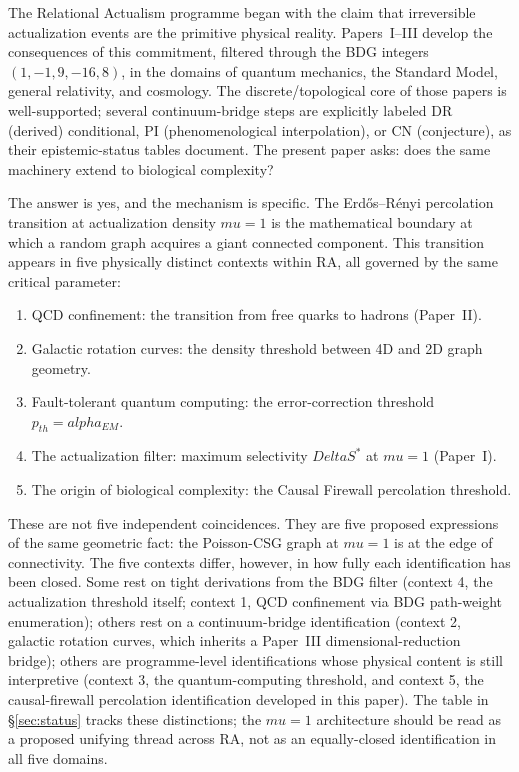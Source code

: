 \documentclass[11pt]{article}
\def\Delta{Delta}%
\def\mu{mu}%
\def\alpha{alpha}%
\def\mathrm#1{#1}%
\begin{document}
The Relational Actualism programme began with the claim that irreversible actualization events are the primitive physical reality. Papers~I--III develop the consequences of this commitment, filtered through the BDG integers $(1,-1,9,-16,8)$, in the domains of quantum mechanics, the Standard Model, general relativity, and cosmology. The discrete/topological core of those papers is well-supported; several continuum-bridge steps are explicitly labeled DR (derived) conditional, PI (phenomenological interpolation), or CN (conjecture), as their epistemic-status tables document. The present paper asks: does the same machinery extend to biological complexity?

The answer is yes, and the mechanism is specific. The Erd\H{o}s--R\'enyi percolation transition at actualization density $\mu=1$ is the mathematical boundary at which a random graph acquires a giant connected component. This transition appears in five physically distinct contexts within RA, all governed by the same critical parameter:
\begin{enumerate}[nosep]
\item QCD confinement: the transition from free quarks to hadrons (Paper~II).
\item Galactic rotation curves: the density threshold between 4D and 2D graph geometry.
\item Fault-tolerant quantum computing: the error-correction threshold $p_{\mathrm{th}}=\alpha_{\mathrm{EM}}$.
\item The actualization filter: maximum selectivity $\Delta S^*$ at $\mu=1$ (Paper~I).
\item The origin of biological complexity: the Causal Firewall percolation threshold.
\end{enumerate}

These are not five independent coincidences. They are five proposed expressions of the same geometric fact: the Poisson-CSG graph at $\mu=1$ is at the edge of connectivity. The five contexts differ, however, in how fully each identification has been closed. Some rest on tight derivations from the BDG filter (context 4, the actualization threshold itself; context 1, QCD confinement via BDG path-weight enumeration); others rest on a continuum-bridge identification (context 2, galactic rotation curves, which inherits a Paper~III dimensional-reduction bridge); others are programme-level identifications whose physical content is still interpretive (context 3, the quantum-computing threshold, and context 5, the causal-firewall percolation identification developed in this paper). The table in \S\ref{sec:status} tracks these distinctions; the $\mu=1$ architecture should be read as a proposed unifying thread across RA, not as an equally-closed identification in all five domains.
\end{document}
